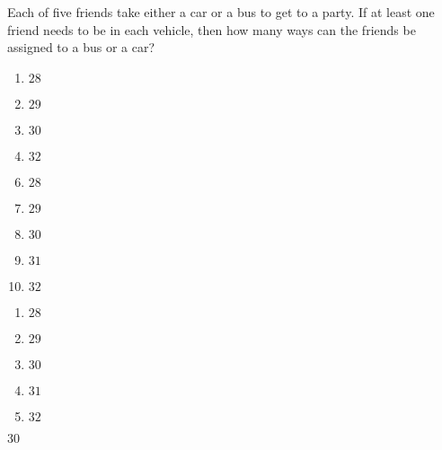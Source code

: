 

 Each of five friends take either a car or a bus to get to a party.  If at least one friend needs to be in each vehicle, then how many ways can the friends be assigned to a bus or a car?


\ifsat
	\begin{enumerate}[label=\Alph*)]
		\item   $28$
		\item  $29$
		\item $30$%
		\item  $32$
	\end{enumerate}
\else
\fi

\ifacteven
	\begin{enumerate}[label=\textbf{\Alph*.},itemsep=\fill,align=left]
		\setcounter{enumii}{5}
		\item   $28$
		\item  $29$
		\item $30$%
		\addtocounter{enumii}{1}
		\item $31$
		\item  $32$
	\end{enumerate}
\else
\fi

\ifactodd
	\begin{enumerate}[label=\textbf{\Alph*.},itemsep=\fill,align=left]
		\item   $28$
		\item  $29$
		\item $30$%
		\item $31$
		\item  $32$
	\end{enumerate}
\else
\fi

\ifgridin
 $30$%
		
\else
\fi

